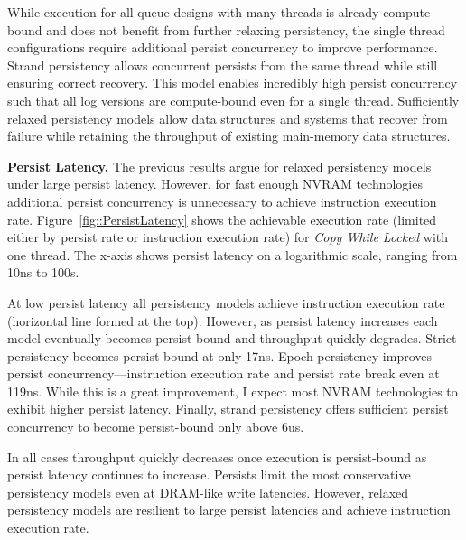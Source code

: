 While execution for all queue designs with many threads is already compute bound and does not benefit from further relaxing persistency, the single thread configurations require additional persist concurrency to improve performance.
Strand persistency allows concurrent persists from the same thread while still ensuring correct recovery.
This model enables incredibly high persist concurrency such that all log versions are compute-bound even for a single thread.
Sufficiently relaxed persistency models allow data structures and systems that recover from failure while retaining the throughput of existing main-memory data structures.

\textbf{Persist Latency.}
The previous results argue for relaxed persistency models under large persist latency.
However, for fast enough NVRAM technologies additional persist concurrency is unnecessary to achieve instruction execution rate.
Figure~\ref{fig::PersistLatency} shows the achievable execution rate (limited either by persist rate or instruction execution rate) for \emph{Copy While Locked} with one thread.
The x-axis shows persist latency on a logarithmic scale, ranging from 10ns to 100\textmu s.

%
 

At low persist latency all persistency models achieve instruction execution rate (horizontal line formed at the top).
However, as persist latency increases each model eventually becomes persist-bound and throughput quickly degrades.
Strict persistency becomes persist-bound at only 17ns.
Epoch persistency improves persist concurrency---instruction execution rate and persist rate break even at 119ns.
While this is a great improvement, I expect most NVRAM technologies to exhibit higher persist latency.
Finally, strand persistency offers sufficient persist concurrency to become persist-bound only above 6us.

In all cases throughput quickly decreases once execution is persist-bound as persist latency continues to increase.
Persists limit the most conservative persistency models even at DRAM-like write latencies.
However, relaxed persistency models are resilient to large persist latencies and achieve instruction execution rate.

